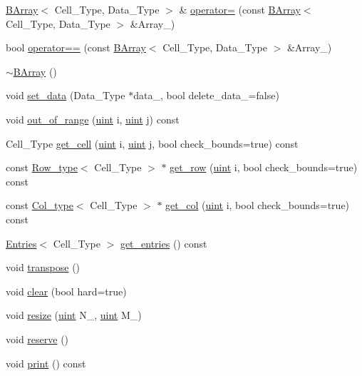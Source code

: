 \begin{DoxyCompactItemize}
\item 
\hyperlink{class_b_array}{B\+Array}$<$ Cell\+\_\+\+Type, Data\+\_\+\+Type $>$ \& \hyperlink{class_b_array_aa6dba52877c92fa8eafc35faa5f7f304}{operator=} (const \hyperlink{class_b_array}{B\+Array}$<$ Cell\+\_\+\+Type, Data\+\_\+\+Type $>$ \&Array\+\_\+)
\item 
bool \hyperlink{class_b_array_a1e6e18162202b06e19f214097eb993bf}{operator==} (const \hyperlink{class_b_array}{B\+Array}$<$ Cell\+\_\+\+Type, Data\+\_\+\+Type $>$ \&Array\+\_\+)
\item 
\hyperlink{class_b_array_af39acdf29aa5999a7f5fd48141be384e}{$\sim$\+B\+Array} ()
\item 
void \hyperlink{class_b_array_accf44b49caa7746a462a3ac9b6024cfc}{set\+\_\+data} (Data\+\_\+\+Type $\ast$data\+\_\+, bool delete\+\_\+data\+\_\+=false)
\item 
void \hyperlink{class_b_array_a87bad4dcad82009d5721d21808b7e469}{out\+\_\+of\+\_\+range} (\hyperlink{typedefs_8hpp_a91ad9478d81a7aaf2593e8d9c3d06a14}{uint} i, \hyperlink{typedefs_8hpp_a91ad9478d81a7aaf2593e8d9c3d06a14}{uint} j) const
\item 
Cell\+\_\+\+Type \hyperlink{class_b_array_a4096e4447f91ba52766587a08c62f1fa}{get\+\_\+cell} (\hyperlink{typedefs_8hpp_a91ad9478d81a7aaf2593e8d9c3d06a14}{uint} i, \hyperlink{typedefs_8hpp_a91ad9478d81a7aaf2593e8d9c3d06a14}{uint} j, bool check\+\_\+bounds=true) const
\item 
const \hyperlink{typedefs_8hpp_a83d6ee40a2ba22844108bb8b82e9b951}{Row\+\_\+type}$<$ Cell\+\_\+\+Type $>$ $\ast$ \hyperlink{class_b_array_a2c969ceb1d37eff9ebcac25741de1808}{get\+\_\+row} (\hyperlink{typedefs_8hpp_a91ad9478d81a7aaf2593e8d9c3d06a14}{uint} i, bool check\+\_\+bounds=true) const
\item 
const \hyperlink{typedefs_8hpp_a00f3fedec1671706175b572e5c57ee0b}{Col\+\_\+type}$<$ Cell\+\_\+\+Type $>$ $\ast$ \hyperlink{class_b_array_a90bd31bc0b3fa59d11150cd4ea39b3b6}{get\+\_\+col} (\hyperlink{typedefs_8hpp_a91ad9478d81a7aaf2593e8d9c3d06a14}{uint} i, bool check\+\_\+bounds=true) const
\item 
\hyperlink{class_entries}{Entries}$<$ Cell\+\_\+\+Type $>$ \hyperlink{class_b_array_aee224325422d214624771a5b4d91b55e}{get\+\_\+entries} () const
\item 
void \hyperlink{class_b_array_a0284f7f2148b7c1b474ebe01f6548b98}{transpose} ()
\item 
void \hyperlink{class_b_array_a6dd5ebff333b376c6fb569e48290935f}{clear} (bool hard=true)
\item 
void \hyperlink{class_b_array_aefe411fe1890273518bfbc3f8ca616ce}{resize} (\hyperlink{typedefs_8hpp_a91ad9478d81a7aaf2593e8d9c3d06a14}{uint} N\+\_\+, \hyperlink{typedefs_8hpp_a91ad9478d81a7aaf2593e8d9c3d06a14}{uint} M\+\_\+)
\item 
void \hyperlink{class_b_array_a5eacd388e3d0f638f2c35b6e0f0c490c}{reserve} ()
\item 
void \hyperlink{class_b_array_a9d150c44b23cf1e4af45f540508db1de}{print} () const
\end{DoxyCompactItemize}
